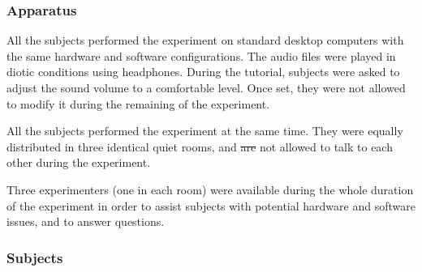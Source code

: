 \documentclass[12pt]{elsarticle}
\providecommand{\DIFadd}[1]{{\protect\color{blue}\uwave{#1}}} %
\providecommand{\DIFdel}[1]{{\protect\color{red}\sout{#1}}}                      %
\providecommand{\DIFaddbegin}{} %
\providecommand{\DIFaddend}{} %
\providecommand{\DIFdelbegin}{} %
\providecommand{\DIFdelend}{} %
\begin{document}
\DIFaddbegin 

\DIFaddend \subsubsection*{Apparatus}


All the subjects performed the experiment on standard desktop computers with the same hardware and software configurations. The audio files were played in diotic conditions using headphones. During the tutorial, subjects were asked to adjust the sound volume to a comfortable level. Once set, they were not allowed to modify it during the remaining of the experiment.


All the subjects performed the experiment at the same time. They were equally distributed in three identical quiet rooms, and \DIFdelbegin \DIFdel{are }\DIFdelend \DIFaddbegin \DIFadd{were }\DIFaddend not allowed to talk to each other during the experiment.


Three experimenters (one in each room) were available during the whole duration of the experiment in order to assist subjects with potential hardware and software issues, and to answer questions.

\DIFaddbegin 

\DIFaddend \subsubsection*{Subjects}
\end{document}
